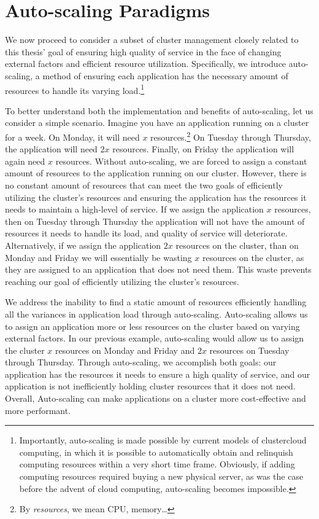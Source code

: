 \documentclass[twoside]{report}
\begin{document}
\section{Auto-scaling Paradigms}

We now proceed to consider a subset of cluster management closely related to
this thesis' goal of ensuring high quality of service in the face of changing
external factors and efficient resource utilization. Specifically, we introduce
auto-scaling, a method of ensuring each application has the necessary amount
of resources to handle its varying load.\footnote{Importantly, auto-scaling is
made possible by current models of cluster\/cloud computing, in which it is
possible to automatically obtain and relinquish computing resources within a
very short time frame. Obviously, if adding computing resources required buying
a new physical server, as was the case before the advent of cloud computing,
auto-scaling becomes impossible.}

To better understand both the implementation and benefits of auto-scaling, let
us consider a simple scenario. Imagine you have an application running on a
cluster for a week. On Monday, it will need $x$ resources.\footnote{By
  \textit{resources}, we mean CPU, memory\dots} On Tuesday through
Thursday, the application will need $2x$ resources. Finally, on Friday the
application will again need $x$ resources. Without auto-scaling, we are forced
to assign a constant amount of resources to the application running on our
cluster. However, there is no constant amount of resources that can meet
the two goals of efficiently utilizing the cluster's resources and ensuring the
application has the resources it needs to maintain a high-level of service. If
we assign the application $x$ resources, then on Tuesday through Thursday the
application will not have the amount of resources it needs to handle its load,
and quality of service will deteriorate. Alternatively, if we assign the
application $2x$ resources on the cluster, than on Monday and Friday we will
essentially be wasting $x$ resources on the cluster, as they are assigned to an
application that does not need them. This waste prevents reaching our goal of
efficiently utilizing the cluster's resources.

We address the inability to find a static amount of resources efficiently
handling all the variances in application load through auto-scaling.
Auto-scaling allows us to assign an application more or less resources on the
cluster based on varying external factors. In our previous example, auto-scaling
would allow us to assign the cluster $x$ resources on Monday and Friday and
$2x$ resources on Tuesday through Thursday. Through auto-scaling, we accomplish
both goals: our application has the resources it needs to ensure a high quality
of service, and our application is not inefficiently holding cluster resources
that it does not need. Overall, Auto-scaling can make applications on a cluster more
cost-effective and more performant.
\end{document}
